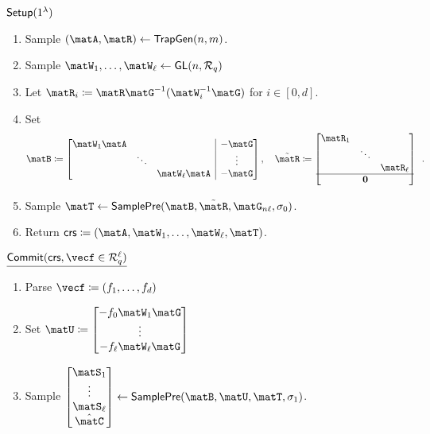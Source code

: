 \documentclass[11pt,letterpaper]{article}
\newcounter{theo}[section]
\theoremstyle{definition} %
\newcommand{\from}{\gets}
\begin{document}
\begin{figure}
    \centering
    \begin{theo}
    \underline{$\mathsf{Setup}(1^\lambda)$}
    \begin{enumerate}[noitemsep]
      \item Sample $(\matA, \matR) \from \trapgen(n, m)$.
      \item Sample $\matW_1,\ldots,\matW_\ell \from \GL(n,\Rq)$
      \item Let $\matR_i \coloneqq \matR \matG^{-1}(\matW_i^{-1} \matG)$ for $i \in [0,d]$.
      \item Set \begin{equation*} 
      \matB \coloneqq 
      \left[\begin{array}{@{}ccc|c@{}}
        \matW_1\matA &        & & -\matG \\ 
        & \ddots & & \vdots \\ 
        & & \matW_{\ell} \matA & -\matG
      \end{array}\right], \quad 
      \tilde{\matR} \coloneqq
      \begin{bmatrix}
        \matR_{1} & & \\
        & \ddots & \\
        & & \matR_{\ell} \\
        \hline 
        & \matzero &
      \end{bmatrix}
      \enspace.
    \end{equation*}
    \item Sample $\matT \from \samplepre(\matB, \tilde{\matR}, \matG_{n\ell}, \sigma_0)$.
    \item Return $\crs \coloneqq (\matA, \matW_1,\ldots,\matW_\ell, \matT)$.
    \end{enumerate}
    \vspace{5mm}
    $\underline{\polycommit(\crs, \vecf \in \Rq^{\ell})}$
    \begin{enumerate}[noitemsep]
    \item Parse $\vecf \coloneqq  (f_1,\ldots,f_d)$
      \item Set $\matU \coloneqq \begin{bmatrix} -f_0 \matW_1 \matG \\ \vdots \\ -f_\ell \matW_\ell \matG \end{bmatrix}$
      \item Sample $\begin{bmatrix} \matS_1 \\ \vdots \\ \matS_\ell \\ \hat{\matC} \end{bmatrix} \from \samplepre(\matB, \matU, \matT, \sigma_1)$.

\end{enumerate}
\end{theo}
\end{figure}
\end{document}
